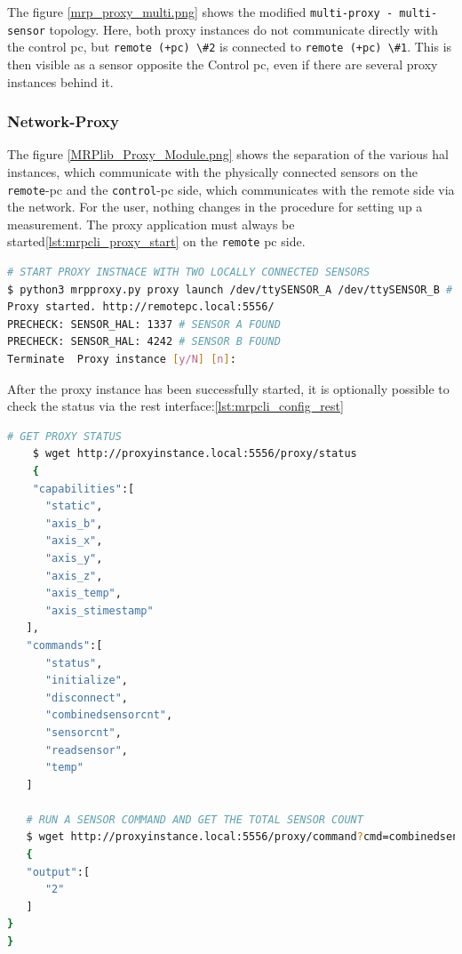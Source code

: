 The figure \ref{mrp_proxy_multi.png} shows the modified
\passthrough{\lstinline!multi-proxy - multi-sensor!} topology. Here,
both proxy instances do not communicate directly with the control
\gls{pc}, but \passthrough{\lstinline!remote (+pc) \#2!} is connected to
\passthrough{\lstinline!remote (+pc) \#1!}. This is then visible as a
sensor opposite the Control \gls{pc}, even if there are several proxy
instances behind it.

\hypertarget{network-proxy}{%
\subsubsection{Network-Proxy}\label{network-proxy}}

The figure \ref{MRPlib_Proxy_Module.png} shows the separation of the
various \gls{hal} instances, which communicate with the physically
connected sensors on the \passthrough{\lstinline!remote!}-\gls{pc} and
the \passthrough{\lstinline!control!}-\gls{pc} side, which communicates
with the remote side via the network. For the user, nothing changes in
the procedure for setting up a measurement. The proxy application must
always be started\ref{lst:mrpcli_proxy_start} on the
\passthrough{\lstinline!remote!} \gls{pc} side.

\begin{lstlisting}[language=bash, caption={MRPproxy usage to enable local sensor usage over network}, label=lst:mrpcli_proxy_start]
# START PROXY INSTNACE WITH TWO LOCALLY CONNECTED SENSORS
$ python3 mrpproxy.py proxy launch /dev/ttySENSOR_A /dev/ttySENSOR_B # add another proxy instance http://proxyinstance_2.local for multi-sensor, multi-proxy chain
Proxy started. http://remotepc.local:5556/
PRECHECK: SENSOR_HAL: 1337 # SENSOR A FOUND
PRECHECK: SENSOR_HAL: 4242 # SENSOR B FOUND
Terminate  Proxy instance [y/N] [n]: 
\end{lstlisting}

After the proxy instance has been successfully started, it is optionally
possible to check the status via the \gls{rest}
interface:\ref{lst:mrpcli_config_rest}

\begin{lstlisting}[language=bash, caption={MRPproxy REST enpoiint query examples}, label=lst:mrpcli_config_rest]
    # GET PROXY STATUS
    $ wget http://proxyinstance.local:5556/proxy/status
    {
    "capabilities":[
      "static",
      "axis_b",
      "axis_x",
      "axis_y",
      "axis_z",
      "axis_temp",
      "axis_stimestamp"
   ],
   "commands":[
      "status",
      "initialize",
      "disconnect",
      "combinedsensorcnt",
      "sensorcnt",
      "readsensor",
      "temp"
   ]

   # RUN A SENSOR COMMAND AND GET THE TOTAL SENSOR COUNT
   $ wget http://proxyinstance.local:5556/proxy/command?cmd=combinedsensorcnt
   {
   "output":[
      "2"
   ]
}
}
\end{lstlisting}


